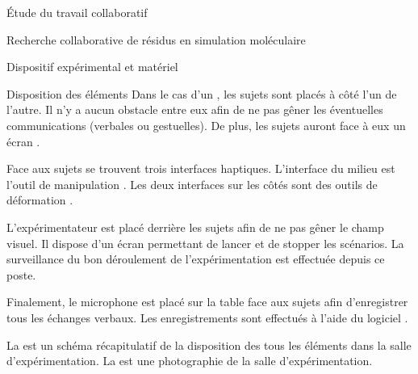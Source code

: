 \documentclass[myfrancais]{mythesis}
\begin{document}
\begin{mypart}{Étude du travail collaboratif}
\begin{mychapter}{Recherche collaborative de résidus en simulation moléculaire}
\begin{mysection}{Dispositif expérimental et matériel}
\begin{mysubsection}{Disposition des éléments}
					Dans le cas d'un , les sujets sont placés à côté l'un de l'autre.
					Il n'y a aucun obstacle entre eux afin de ne pas gêner les éventuelles communications (verbales ou gestuelles).
					De plus, les sujets auront face à eux un écran \myLCD.

					Face aux sujets se trouvent trois interfaces haptiques.
					L'interface du milieu est l'outil de manipulation .
					Les deux interfaces sur les côtés sont des outils de déformation  .

					L'expérimentateur est placé derrière les sujets afin de ne pas gêner le champ visuel.
					Il dispose d'un écran permettant de lancer et de stopper les scénarios.
					La surveillance du bon déroulement de l'expérimentation est effectuée depuis ce poste.

					Finalement, le microphone est placé sur la table face aux sujets afin d'enregistrer tous les échanges verbaux.
					Les enregistrements sont effectués à l'aide du logiciel \myAudacity.

					La  est un schéma récapitulatif de la disposition des tous les éléments dans la salle d'expérimentation.
					La  est une photographie de la salle d'expérimentation.


\end{mysubsection}
\end{mysection}
\end{mychapter}
\end{mypart}
\end{document}
